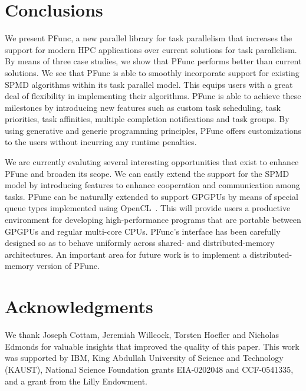 \documentclass{sig-alternate}
\begin{document}
\section{Conclusions}
\label{sec:conclusion}
We present PFunc, a new parallel library for task parallelism that
increases the support for modern HPC applications over current solutions for
task parallelism.  By means of three case studies, we show that PFunc
performs better than current solutions.  We see that PFunc is able to
smoothly incorporate support for existing SPMD algorithms within its task
parallel model. This equips users with a great deal of flexibility in
implementing their algorithms.  PFunc is able to achieve these milestones by
introducing new features such as custom task scheduling, task priorities, task
affinities, multiple completion notifications and task groups. By using
generative and generic programming principles, PFunc offers customizations to
the users without incurring any runtime penalties.

We are currently evaluting several interesting opportunities that exist to
enhance PFunc and broaden its scope.  We can easily extend the support for the
SPMD model by introducing features to enhance cooperation and communication
among tasks.  PFunc can be naturally extended to support GPGPUs by means of
special queue types implemented using OpenCL~\cite{MUNSHI08siggraph}. This will
provide users a productive environment for developing high-performance programs
that are portable between GPGPUs and regular multi-core CPUs.  PFunc's
interface has been carefully designed so as to behave uniformly across shared-
and distributed-memory architectures.  An important area for future work is to
implement a distributed-memory version of PFunc.

\section{Acknowledgments}
We thank Joseph Cottam, Jeremiah Willcock, Torsten Hoefler and Nicholas Edmonds
for valuable insights that improved the quality of this paper.  This work was
supported by IBM, King Abdullah University of Science and Technology (KAUST),
National Science Foundation grants EIA-0202048 and CCF-0541335, and a grant
from the Lilly Endowment.

\small


\end{document}
